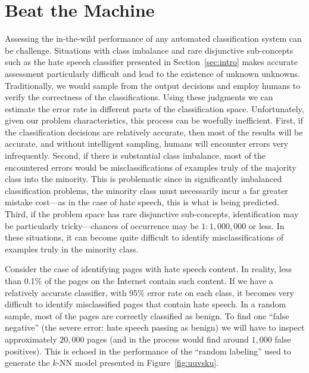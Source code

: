 \section{Beat the Machine}
\label{sec:btm}


Assessing the in-the-wild performance of any automated classification system can be challenge. Situations with class imbalance and rare disjunctive sub-concepts such as the hate speech classifier presented in Section~\ref{sec:intro} makes accurate assessment particularly difficult and lead to the existence of unknown unknowns. Traditionally, we would sample from the output decisions and employ humans to verify the correctness of the classifications.  Using these judgments we can estimate the error rate in different parts of the classification space. Unfortunately, given our problem characteristics, this process can be woefully inefficient. First, if the classification decisions are relatively accurate, then most of the results will be accurate, and without intelligent sampling, humans will encounter errors very infrequently. Second, if there is substantial class imbalance, most of the encountered errors would be misclassifications of examples truly of the majority class into the minority. This is problematic since in significantly imbalanced classification problems, the minority class must necessarily incur a far greater mistake cost---as in the case of hate speech, this is what is being predicted. Third, if the problem space has rare disjunctive sub-concepts, identification may be particularly tricky---chances of occurrence may be $1:1,000,000$ or less. In these situations, it can become quite difficult to identify misclassifications of examples truly in the minority class. 

\begin{xmpl} Consider the case of identifying pages with hate speech content. In   reality, less than 0.1\% of the pages on the Internet contain such content. If we   have a relatively accurate classifier, with 95\% error rate on each class, it becomes very difficult to identify misclassified pages that contain hate speech. In a random sample, most of the pages are correctly classified as benign. To find one ``false negative'' (the severe error: hate speech passing as benign) we will have to inspect approximately $20,000$ pages (and in the process would find around $1,000$ false positives). This is echoed in the   performance of the ``random labeling'' used to generate the $k$-NN model presented in Figure~\ref{fig:uuvsku}. \end{xmpl} 

